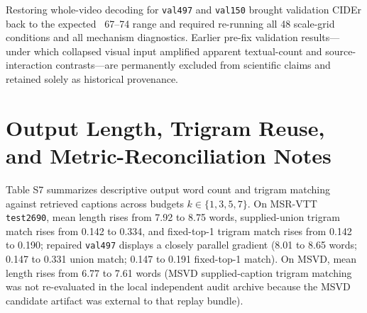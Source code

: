 \documentclass[11pt,a4paper]{article}
\begin{document}
Restoring whole-video decoding for \texttt{val497} and \texttt{val150} brought validation CIDEr back to the expected ~67--74 range and required re-running all 48 scale-grid conditions and all mechanism diagnostics. Earlier pre-fix validation results---under which collapsed visual input amplified apparent textual-count and source-interaction contrasts---are permanently excluded from scientific claims and retained solely as historical provenance.

\section{Output Length, Trigram Reuse, and Metric-Reconciliation Notes}
Table S7 summarizes descriptive output word count and trigram matching against retrieved captions across budgets $k \in \{1, 3, 5, 7\}$. On MSR-VTT \texttt{test2690}, mean length rises from 7.92 to 8.75 words, supplied-union trigram match rises from 0.142 to 0.334, and fixed-top-1 trigram match rises from 0.142 to 0.190; repaired \texttt{val497} displays a closely parallel gradient (8.01 to 8.65 words; 0.147 to 0.331 union match; 0.147 to 0.191 fixed-top-1 match). On MSVD, mean length rises from 6.77 to 7.61 words (MSVD supplied-caption trigram matching was not re-evaluated in the local independent audit archive because the MSVD candidate artifact was external to that replay bundle).
\end{document}
